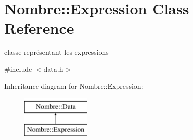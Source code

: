 \hypertarget{classNombre_1_1Expression}{
\section{Nombre::Expression Class Reference}
\label{classNombre_1_1Expression}
}


classe représentant les expressions  




{\ttfamily \#include $<$data.h$>$}

Inheritance diagram for Nombre::Expression:\begin{figure}[H]
\begin{center}
\leavevmode
\includegraphics[height=2cm]{classNombre_1_1Expression}
\end{center}
\end{figure}
